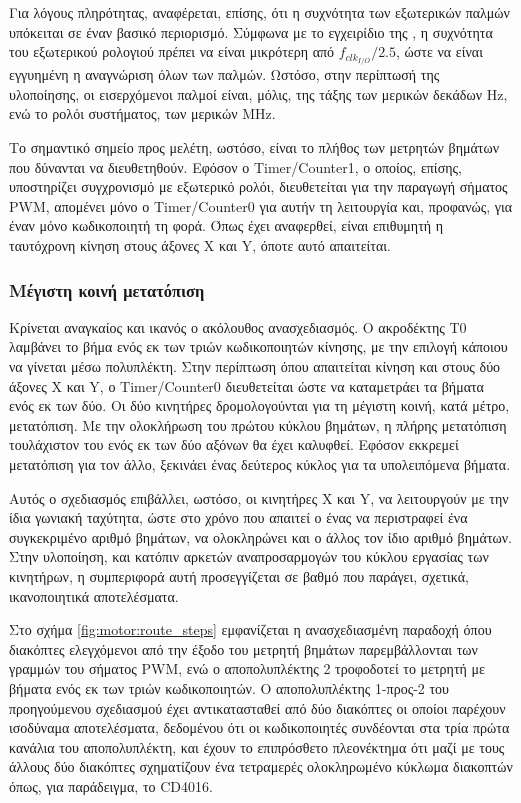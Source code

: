 Για λόγους πληρότητας, αναφέρεται, επίσης, ότι η συχνότητα των εξωτερικών παλμών
υπόκειται σε έναν βασικό περιορισμό. Σύμφωνα με το εγχειρίδιο της
\textcite[139--140]{atmel13}, η συχνότητα του εξωτερικού ρολογιού πρέπει να
είναι μικρότερη από $f_{clk_{I/O}}/2.5$, ώστε να είναι εγγυημένη η αναγνώριση
όλων των παλμών. Ωστόσο, στην περίπτωσή της υλοποίησης, οι εισερχόμενοι παλμοί
είναι, μόλις, της τάξης των μερικών δεκάδων Hz, ενώ το ρολόι συστήματος, των
μερικών MHz.

Το σημαντικό σημείο προς μελέτη, ωστόσο, είναι το πλήθος των μετρητών βημάτων
που δύνανται να διευθετηθούν. Εφόσον ο \textenglish{Timer\slash Counter1}, ο
οποίος, επίσης, υποστηρίζει συγχρονισμό με εξωτερικό ρολόι, διευθετείται για την
παραγωγή σήματος PWM, απομένει μόνο ο \textenglish{Timer\slash Counter0} για
αυτήν τη λειτουργία και, προφανώς, για έναν μόνο κωδικοποιητή τη φορά. Όπως έχει
αναφερθεί, είναι επιθυμητή η ταυτόχρονη κίνηση στους άξονες X και Y, όποτε αυτό
απαιτείται.


\subsubsection{Μέγιστη κοινή μετατόπιση}
\label{ssubsec:motor:common-translation}

Κρίνεται αναγκαίος και ικανός ο ακόλουθος ανασχεδιασμός. Ο ακροδέκτης T0
λαμβάνει το βήμα ενός εκ των τριών κωδικοποιητών κίνησης, με την επιλογή κάποιου
να γίνεται μέσω πολυπλέκτη. Στην περίπτωση όπου απαιτείται κίνηση και στους δύο
άξονες X και Y, ο \textenglish{Timer\slash Counter0} διευθετείται ώστε να
καταμετράει τα βήματα ενός εκ των δύο. Οι δύο κινητήρες δρομολογούνται για τη
μέγιστη κοινή, κατά μέτρο, μετατόπιση. Με την ολοκλήρωση του πρώτου κύκλου
βημάτων, η πλήρης μετατόπιση τουλάχιστον του ενός εκ των δύο αξόνων θα έχει
καλυφθεί. Εφόσον εκκρεμεί μετατόπιση για τον άλλο, ξεκινάει ένας δεύτερος κύκλος
για τα υπολειπόμενα βήματα.

Αυτός ο σχεδιασμός επιβάλλει, ωστόσο, οι κινητήρες X και Y, να λειτουργούν με
την ίδια γωνιακή ταχύτητα, ώστε στο χρόνο που απαιτεί ο ένας να περιστραφεί
ένα συγκεκριμένο αριθμό βημάτων, να ολοκληρώνει και ο άλλος τον ίδιο αριθμό
βημάτων. Στην υλοποίηση, και κατόπιν αρκετών αναπροσαρμογών του κύκλου εργασίας
των κινητήρων, η συμπεριφορά αυτή προσεγγίζεται σε βαθμό που παράγει, σχετικά,
ικανοποιητικά αποτελέσματα.

Στο σχήμα \ref{fig:motor:route_steps} εμφανίζεται η ανασχεδιασμένη παραδοχή
όπου διακόπτες ελεγχόμενοι από την έξοδο του μετρητή βημάτων παρεμβάλλονται των
γραμμών του σήματος PWM, ενώ ο αποπολυπλέκτης 2 τροφοδοτεί το μετρητή με βήματα
ενός εκ των τριών κωδικοποιητών. Ο αποπολυπλέκτης 1-προς-2 του προηγούμενου
σχεδιασμού έχει αντικατασταθεί από δύο διακόπτες οι οποίοι παρέχουν ισοδύναμα
αποτελέσματα, δεδομένου ότι οι κωδικοποιητές συνδέονται στα τρία πρώτα κανάλια
του αποπολυπλέκτη, και έχουν το επιπρόσθετο πλεονέκτημα ότι μαζί με τους άλλους
δύο διακόπτες σχηματίζουν ένα τετραμερές ολοκληρωμένο κύκλωμα διακοπτών όπως,
για παράδειγμα, το CD4016.

